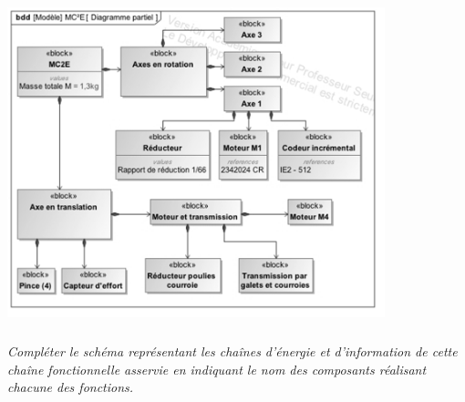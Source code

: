 \documentclass[10pt,fleqn]{article} %
\begin{document}
\begin{center}
\begin{center}
\includegraphics[height=9cm]{images/Sujet/images/fig_03}
\end{center}
\end{center}

\subparagraph{}
\textit{Compléter le schéma représentant les chaînes d’énergie et d’information de cette chaîne
fonctionnelle asservie en indiquant le nom des composants réalisant chacune des fonctions.}

%
%
%
%
%
%
\end{document}
